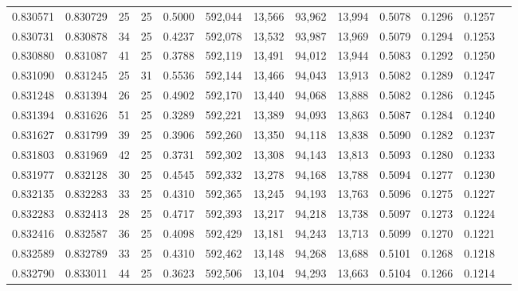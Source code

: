 \begin{tabular}{rrrrrrrrrrrrr}
0.830571 & 0.830729 &    25 &  25 &                                     0.5000 & 592,044 &  13,566 &  93,962 &  13,994 & 0.5078 & 0.1296 & 0.1257 \\
0.830731 & 0.830878 &    34 &  25 &                                     0.4237 & 592,078 &  13,532 &  93,987 &  13,969 & 0.5079 & 0.1294 & 0.1253 \\
0.830880 & 0.831087 &    41 &  25 &                                     0.3788 & 592,119 &  13,491 &  94,012 &  13,944 & 0.5083 & 0.1292 & 0.1250 \\
0.831090 & 0.831245 &    25 &  31 &                                     0.5536 & 592,144 &  13,466 &  94,043 &  13,913 & 0.5082 & 0.1289 & 0.1247 \\
0.831248 & 0.831394 &    26 &  25 &                                     0.4902 & 592,170 &  13,440 &  94,068 &  13,888 & 0.5082 & 0.1286 & 0.1245 \\
0.831394 & 0.831626 &    51 &  25 &                                     0.3289 & 592,221 &  13,389 &  94,093 &  13,863 & 0.5087 & 0.1284 & 0.1240 \\
0.831627 & 0.831799 &    39 &  25 &                                     0.3906 & 592,260 &  13,350 &  94,118 &  13,838 & 0.5090 & 0.1282 & 0.1237 \\
0.831803 & 0.831969 &    42 &  25 &                                     0.3731 & 592,302 &  13,308 &  94,143 &  13,813 & 0.5093 & 0.1280 & 0.1233 \\
0.831977 & 0.832128 &    30 &  25 &                                     0.4545 & 592,332 &  13,278 &  94,168 &  13,788 & 0.5094 & 0.1277 & 0.1230 \\
0.832135 & 0.832283 &    33 &  25 &                                     0.4310 & 592,365 &  13,245 &  94,193 &  13,763 & 0.5096 & 0.1275 & 0.1227 \\
0.832283 & 0.832413 &    28 &  25 &                                     0.4717 & 592,393 &  13,217 &  94,218 &  13,738 & 0.5097 & 0.1273 & 0.1224 \\
0.832416 & 0.832587 &    36 &  25 &                                     0.4098 & 592,429 &  13,181 &  94,243 &  13,713 & 0.5099 & 0.1270 & 0.1221 \\
0.832589 & 0.832789 &    33 &  25 &                                     0.4310 & 592,462 &  13,148 &  94,268 &  13,688 & 0.5101 & 0.1268 & 0.1218 \\
0.832790 & 0.833011 &    44 &  25 &                                     0.3623 & 592,506 &  13,104 &  94,293 &  13,663 & 0.5104 & 0.1266 & 0.1214 \\

\end{tabular}
